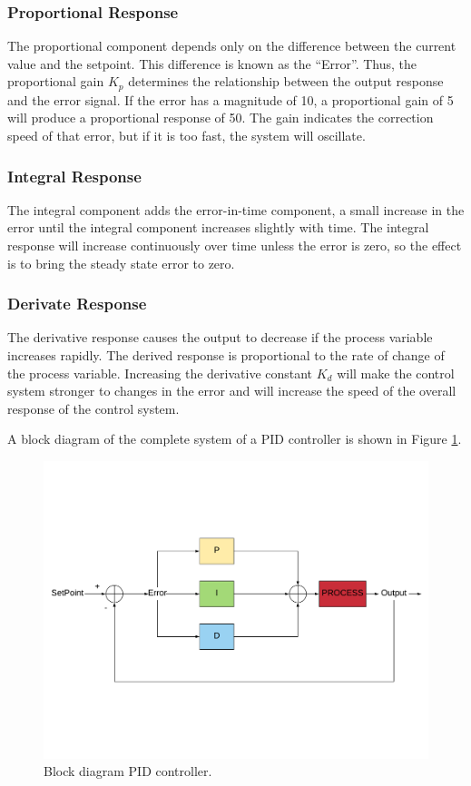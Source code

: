 \subsubsection{Proportional Response}

The proportional component depends only on the difference between the current value and the setpoint. This difference is known as the “Error”. Thus, the proportional gain $K_{p}$ determines the relationship between the output response and the error signal. If the error has a magnitude of 10, a proportional gain of 5 will produce a proportional response of 50. The gain indicates the correction speed of that error, but if it is too fast, the system will oscillate. 
\subsubsection{Integral Response}
The integral component adds the error-in-time component, a small increase in the error until the integral component increases slightly with time. The integral response will increase continuously over time unless the error is zero, so the effect is to bring the steady state error to zero.
\subsubsection{Derivate Response}
The derivative response causes the output to decrease if the process variable increases rapidly. The derived response is proportional to the rate of change of the process variable. Increasing the derivative constant $K_{d}$ will make the control system stronger to changes in the error and will increase the speed of the overall response of the control system. 

A block diagram of the complete system of a PID controller is shown in Figure \ref{fig:PID}.

\begin{center}
	\begin{figure}[H]
		\center
		\includegraphics[trim = 0mm 4cm 0mm 4cm,clip, angle=0, scale = 0.4]{imagenes/EstadoArte/PID}
		\caption{Block diagram PID controller.}
		\label{fig:PID}
	\end{figure}
\end{center}

